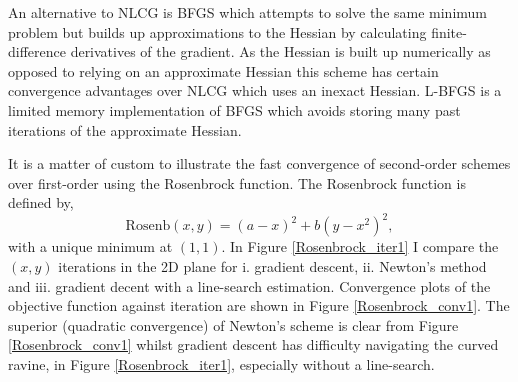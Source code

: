 \documentclass[nohyperref]{article}
\theoremstyle{plain}
\theoremstyle{definition}
\theoremstyle{remark}
\begin{document}
An alternative to NLCG is BFGS which attempts to solve the same minimum problem but builds up approximations to the Hessian by calculating finite-difference derivatives of the gradient. As the Hessian is built up numerically as opposed to relying on an approximate Hessian this scheme has certain convergence advantages over NLCG which uses an inexact Hessian. L-BFGS is a limited memory implementation of BFGS which avoids storing many past iterations of the approximate Hessian.

It is a matter of custom to illustrate the fast convergence of second-order schemes over first-order using the Rosenbrock function. The Rosenbrock function is defined by,
\begin{equation}
\textrm{Rosenb}(x,y)=(a-x)^2+b(y-x^2)^2,\label{rosen_defn}
\end{equation}
with a unique minimum at $(1,1)$. In Figure \ref{Rosenbrock_iter1} I compare the $(x,y)$ iterations in the 2D plane for  i. gradient descent, ii. Newton's method and iii. gradient decent with a line-search estimation.  Convergence plots of the objective function against iteration are shown in Figure \ref{Rosenbrock_conv1}. The superior (quadratic convergence) of Newton's scheme is clear from Figure \ref{Rosenbrock_conv1} whilst gradient descent has difficulty navigating the curved ravine, in Figure \ref{Rosenbrock_iter1}, especially without a line-search. 
\end{document}
